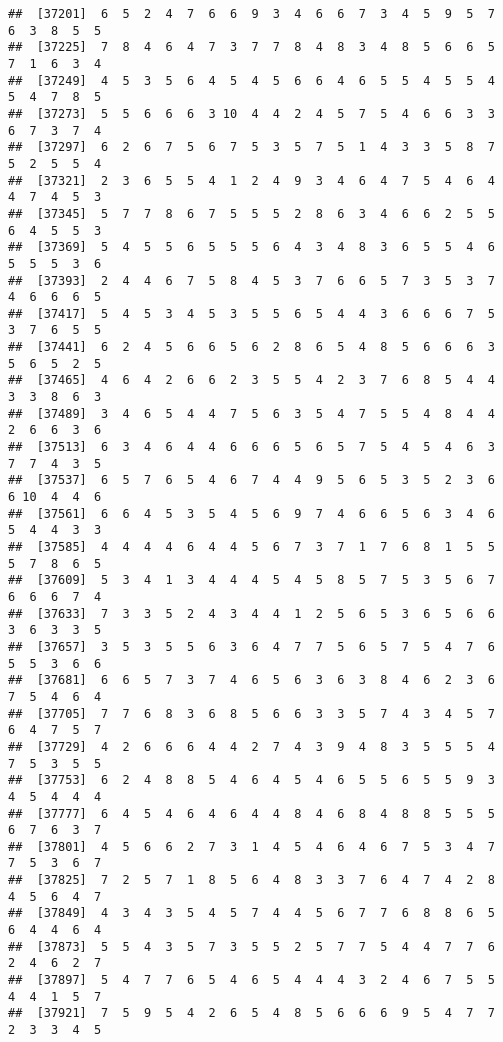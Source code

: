 \documentclass[
]{book}
\begin{document}
\begin{verbatim}
##  [37201]  6  5  2  4  7  6  6  9  3  4  6  6  7  3  4  5  9  5  7  6  3  8  5  5
##  [37225]  7  8  4  6  4  7  3  7  7  8  4  8  3  4  8  5  6  6  5  7  1  6  3  4
##  [37249]  4  5  3  5  6  4  5  4  5  6  6  4  6  5  5  4  5  5  4  5  4  7  8  5
##  [37273]  5  5  6  6  6  3 10  4  4  2  4  5  7  5  4  6  6  3  3  6  7  3  7  4
##  [37297]  6  2  6  7  5  6  7  5  3  5  7  5  1  4  3  3  5  8  7  5  2  5  5  4
##  [37321]  2  3  6  5  5  4  1  2  4  9  3  4  6  4  7  5  4  6  4  4  7  4  5  3
##  [37345]  5  7  7  8  6  7  5  5  5  2  8  6  3  4  6  6  2  5  5  6  4  5  5  3
##  [37369]  5  4  5  5  6  5  5  5  6  4  3  4  8  3  6  5  5  4  6  5  5  5  3  6
##  [37393]  2  4  4  6  7  5  8  4  5  3  7  6  6  5  7  3  5  3  7  4  6  6  6  5
##  [37417]  5  4  5  3  4  5  3  5  5  6  5  4  4  3  6  6  6  7  5  3  7  6  5  5
##  [37441]  6  2  4  5  6  6  5  6  2  8  6  5  4  8  5  6  6  6  3  5  6  5  2  5
##  [37465]  4  6  4  2  6  6  2  3  5  5  4  2  3  7  6  8  5  4  4  3  3  8  6  3
##  [37489]  3  4  6  5  4  4  7  5  6  3  5  4  7  5  5  4  8  4  4  2  6  6  3  6
##  [37513]  6  3  4  6  4  4  6  6  6  5  6  5  7  5  4  5  4  6  3  7  7  4  3  5
##  [37537]  6  5  7  6  5  4  6  7  4  4  9  5  6  5  3  5  2  3  6  6 10  4  4  6
##  [37561]  6  6  4  5  3  5  4  5  6  9  7  4  6  6  5  6  3  4  6  5  4  4  3  3
##  [37585]  4  4  4  4  6  4  4  5  6  7  3  7  1  7  6  8  1  5  5  5  7  8  6  5
##  [37609]  5  3  4  1  3  4  4  4  5  4  5  8  5  7  5  3  5  6  7  6  6  6  7  4
##  [37633]  7  3  3  5  2  4  3  4  4  1  2  5  6  5  3  6  5  6  6  3  6  3  3  5
##  [37657]  3  5  3  5  5  6  3  6  4  7  7  5  6  5  7  5  4  7  6  5  5  3  6  6
##  [37681]  6  6  5  7  3  7  4  6  5  6  3  6  3  8  4  6  2  3  6  7  5  4  6  4
##  [37705]  7  7  6  8  3  6  8  5  6  6  3  3  5  7  4  3  4  5  7  6  4  7  5  7
##  [37729]  4  2  6  6  6  4  4  2  7  4  3  9  4  8  3  5  5  5  4  7  5  3  5  5
##  [37753]  6  2  4  8  8  5  4  6  4  5  4  6  5  5  6  5  5  9  3  4  5  4  4  4
##  [37777]  6  4  5  4  6  4  6  4  4  8  4  6  8  4  8  8  5  5  5  6  7  6  3  7
##  [37801]  4  5  6  6  2  7  3  1  4  5  4  6  4  6  7  5  3  4  7  7  5  3  6  7
##  [37825]  7  2  5  7  1  8  5  6  4  8  3  3  7  6  4  7  4  2  8  4  5  6  4  7
##  [37849]  4  3  4  3  5  4  5  7  4  4  5  6  7  7  6  8  8  6  5  6  4  4  6  4
##  [37873]  5  5  4  3  5  7  3  5  5  2  5  7  7  5  4  4  7  7  6  2  4  6  2  7
##  [37897]  5  4  7  7  6  5  4  6  5  4  4  4  3  2  4  6  7  5  5  4  4  1  5  7
##  [37921]  7  5  9  5  4  2  6  5  4  8  5  6  6  6  9  5  4  7  7  2  3  3  4  5

\end{verbatim}
\end{document}

